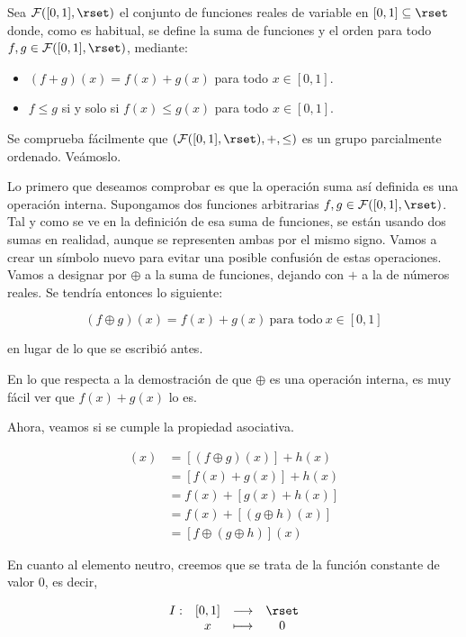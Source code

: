 Sea $\mathcal{F}([0,1], \rset)$ el conjunto de funciones reales de variable
en $[0,1] \subseteq \rset$ donde, como es habitual, se define la suma de
funciones y el orden para todo $f, g \in \mathcal{F}([0,1], \rset)$,
mediante:

\begin{itemize}
  \item $(f + g)(x) = f(x) + g(x)$ para todo $x \in [0,1]$.
  \item $f \leq g$ si y solo si $f(x) \leq g(x)$ para todo $x \in [0,1]$.
\end{itemize}

\noindent Se comprueba fácilmente que $(\mathcal{F}([0,1], \rset), +, \leq)$
es un grupo parcialmente ordenado. Veámoslo.

Lo primero que deseamos comprobar es que la operación suma así definida es
una operación interna. Supongamos dos funciones arbitrarias $f, g \in
\mathcal{F}([0, 1], \rset)$. Tal y como se ve en la definición de esa suma
de funciones, se están usando dos sumas en realidad, aunque se representen
ambas por el mismo signo. Vamos a crear un símbolo nuevo para evitar una
posible confusión de estas operaciones. Vamos a designar por $\oplus$ a la
suma de funciones, dejando con $+$ a la de números reales. Se tendría
entonces lo siguiente:

$$ (f \oplus g)(x) = f(x) + g(x) \ \text{para todo} \ x \in [0,1] $$

\noindent en lugar de lo que se escribió antes.

En lo que respecta a la demostración de que $\oplus$ es una operación
interna, es muy fácil ver que $f(x) + g(x)$ lo es.

Ahora, veamos si se cumple la propiedad asociativa.

\begin{align*}
  [(f \oplus g) \oplus h](x)
    &= [(f \oplus g)(x)] + h(x) \\
    &= [f(x) + g(x)] + h(x) \\
    &= f(x) + [g(x) + h(x)] \\
    &= f(x) + [(g \oplus h)(x)] \\
    &= [f \oplus (g \oplus h)](x)
\end{align*}

En cuanto al elemento neutro, creemos que se trata de la función constante
de valor 0, es decir,

$$
  \begin{array}{rccc}
    I:  & [0, 1]  & \longrightarrow & \rset \\
        & x       & \longmapsto     & 0
  \end{array}
$$

